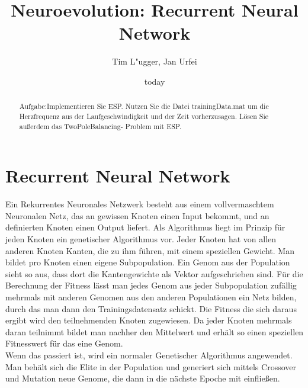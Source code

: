 \documentclass{hbrs-ecta-report}
\begin{document}

\title{Neuroevolution: Recurrent Neural Network}
\subtitle{}

\author{
\alignauthor
Tim L"ugger, Jan Urfei
}

\date{today}
\maketitle
\begin{abstract}
Aufgabe:Implementieren Sie ESP. Nutzen Sie die Datei trainingData.mat um die Herzfrequenz aus der Laufgeschwindigkeit und der Zeit vorherzusagen. Lösen Sie außerdem das TwoPoleBalancing- Problem mit ESP.
\end{abstract}

\section{Recurrent Neural Network}
Ein Rekurrentes Neuronales Netzwerk besteht aus einem vollvermaschtem Neuronalen Netz, das an gewissen Knoten einen Input bekommt, und an definierten Knoten einen Output liefert.
Als Algorithmus liegt im Prinzip für jeden Knoten ein genetischer Algorithmus vor. Jeder Knoten hat von allen anderen Knoten Kanten, die zu ihm führen, mit einem speziellen Gewicht. Man bildet pro Knoten einen eigene Subpopulation. Ein Genom aus der Population sieht so aus, dass dort die Kantengewichte als Vektor aufgeschrieben sind. Für die Berechnung der Fitness lässt man jedes Genom aus jeder Subpopulation zufällig mehrmals mit anderen Genomen aus den anderen Populationen ein Netz bilden, durch das man dann den Trainingsdatensatz schickt. Die Fitness die sich daraus ergibt wird den teilnehmenden Knoten zugewiesen. Da jeder Knoten mehrmals daran teilnimmt bildet man nachher den Mittelwert und erhält so einen speziellen Fitnesswert für das eine Genom.\\
Wenn das passiert ist, wird ein normaler Genetischer Algorithmus angewendet. Man behält sich die Elite in der Population und generiert sich mittels Crossover und Mutation neue Genome, die dann in die nächste Epoche mit einfließen. 
\end{document}
